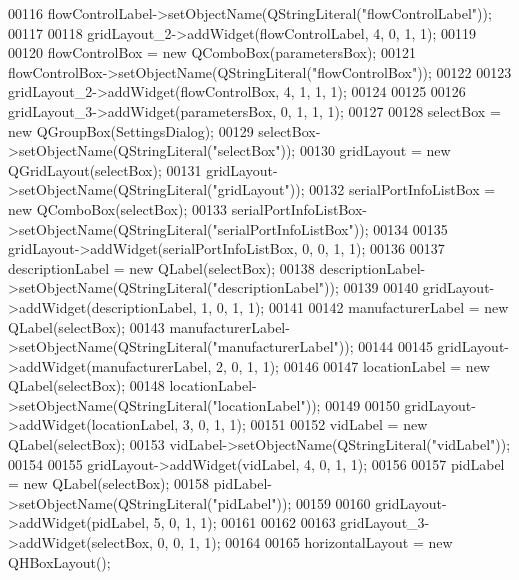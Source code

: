 \begin{DoxyCode}
00116         flowControlLabel->setObjectName(QStringLiteral(\textcolor{stringliteral}{"flowControlLabel"}));
00117 
00118         gridLayout\_2->addWidget(flowControlLabel, 4, 0, 1, 1);
00119 
00120         flowControlBox = \textcolor{keyword}{new} QComboBox(parametersBox);
00121         flowControlBox->setObjectName(QStringLiteral(\textcolor{stringliteral}{"flowControlBox"}));
00122 
00123         gridLayout\_2->addWidget(flowControlBox, 4, 1, 1, 1);
00124 
00125 
00126         gridLayout\_3->addWidget(parametersBox, 0, 1, 1, 1);
00127 
00128         selectBox = \textcolor{keyword}{new} QGroupBox(SettingsDialog);
00129         selectBox->setObjectName(QStringLiteral(\textcolor{stringliteral}{"selectBox"}));
00130         gridLayout = \textcolor{keyword}{new} QGridLayout(selectBox);
00131         gridLayout->setObjectName(QStringLiteral(\textcolor{stringliteral}{"gridLayout"}));
00132         serialPortInfoListBox = \textcolor{keyword}{new} QComboBox(selectBox);
00133         serialPortInfoListBox->setObjectName(QStringLiteral(\textcolor{stringliteral}{"serialPortInfoListBox"}));
00134 
00135         gridLayout->addWidget(serialPortInfoListBox, 0, 0, 1, 1);
00136 
00137         descriptionLabel = \textcolor{keyword}{new} QLabel(selectBox);
00138         descriptionLabel->setObjectName(QStringLiteral(\textcolor{stringliteral}{"descriptionLabel"}));
00139 
00140         gridLayout->addWidget(descriptionLabel, 1, 0, 1, 1);
00141 
00142         manufacturerLabel = \textcolor{keyword}{new} QLabel(selectBox);
00143         manufacturerLabel->setObjectName(QStringLiteral(\textcolor{stringliteral}{"manufacturerLabel"}));
00144 
00145         gridLayout->addWidget(manufacturerLabel, 2, 0, 1, 1);
00146 
00147         locationLabel = \textcolor{keyword}{new} QLabel(selectBox);
00148         locationLabel->setObjectName(QStringLiteral(\textcolor{stringliteral}{"locationLabel"}));
00149 
00150         gridLayout->addWidget(locationLabel, 3, 0, 1, 1);
00151 
00152         vidLabel = \textcolor{keyword}{new} QLabel(selectBox);
00153         vidLabel->setObjectName(QStringLiteral(\textcolor{stringliteral}{"vidLabel"}));
00154 
00155         gridLayout->addWidget(vidLabel, 4, 0, 1, 1);
00156 
00157         pidLabel = \textcolor{keyword}{new} QLabel(selectBox);
00158         pidLabel->setObjectName(QStringLiteral(\textcolor{stringliteral}{"pidLabel"}));
00159 
00160         gridLayout->addWidget(pidLabel, 5, 0, 1, 1);
00161 
00162 
00163         gridLayout\_3->addWidget(selectBox, 0, 0, 1, 1);
00164 
00165         horizontalLayout = \textcolor{keyword}{new} QHBoxLayout();

\end{DoxyCode}

